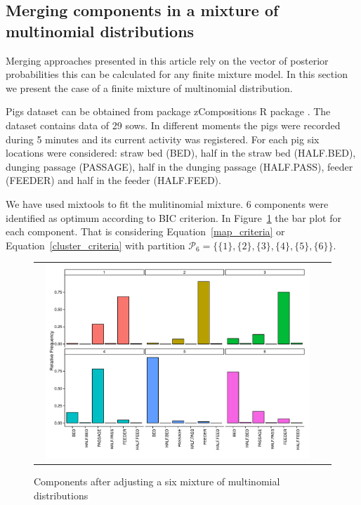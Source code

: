 \documentclass[10pt, a4paper]{article}
\theoremstyle{definition}
\newcommand{\pkg}[1]{{\fontseries{b}\selectfont #1}}
\begin{document}
\begin{spacing}{1.9}
\subsection{Merging components in a mixture of multinomial distributions}

Merging approaches presented in this article rely on the vector of posterior probabilities this can be calculated for any finite mixture model. In this section we present the case of a finite mixture of multinomial distribution.

Pigs dataset can be obtained from package \pkg{zCompositions} R package \citep{palarea2012zcompositions}. The dataset contains data of 29 sows. In different moments the pigs were recorded during 5 minutes and its current activity was registered. For each pig six locations were considered: straw bed (BED), half in the straw bed (HALF.BED), dunging passage (PASSAGE), half in the dunging passage (HALF.PASS), feeder (FEEDER) and half in the feeder (HALF.FEED).

We have used \pkg{mixtools} \citep{benaglia2009mixtools} to fit the mulitinomial mixture. 6 components were identified as optimum according to BIC criterion. In Figure~\ref{multinomial_mixture} the bar plot for each component. That is considering Equation~\ref{map_criteria} or Equation~\ref{cluster_criteria} with partition $\mathcal{P}_6 = \{\{1\}, \{2\}, \{3\}, \{4\}, \{5\}, \{6\}\}$.

\begin{figure}[t]
\begin{center}
\begin{tabular}{cc}
  \includegraphics[width=0.95\textwidth]{figures/multinomial_mixt_all.pdf} \\
 \end{tabular}
 \caption{Components after adjusting a six mixture of multinomial distributions}\label{multinomial_mixture}
\end{center}
\end{figure}


\end{spacing}
\end{document}
